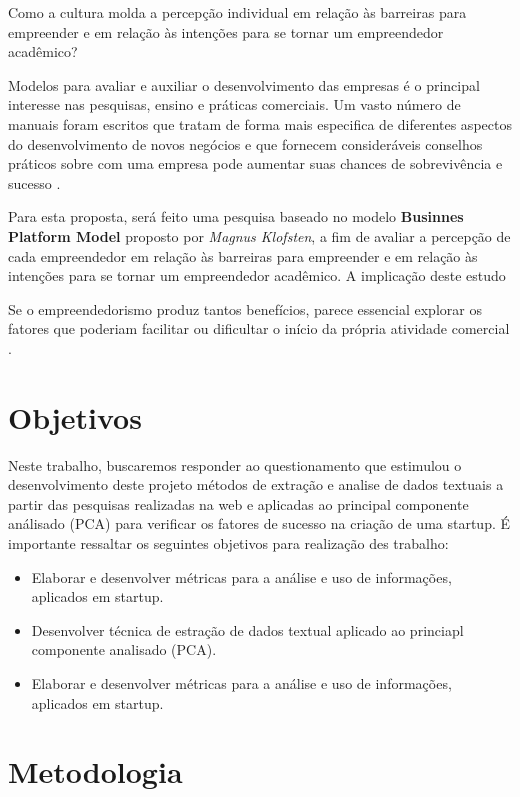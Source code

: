 \documentclass[12pt]{article}
\begin{document}
Como a cultura molda a percepção individual em relação às barreiras para empreender e em relação às intenções para se tornar um empreendedor acadêmico?

Modelos para avaliar e auxiliar o desenvolvimento das empresas é o principal interesse nas pesquisas, ensino e práticas comerciais. Um vasto número de manuais foram escritos que tratam de forma mais especifica de diferentes aspectos do desenvolvimento de novos negócios e que fornecem consideráveis conselhos práticos sobre com uma empresa pode aumentar suas chances de sobrevivência e sucesso \cite{davidsson2003business:2003}.

Para esta proposta, será feito uma pesquisa baseado no modelo \textbf{Businnes Platform Model} proposto por \textit{Magnus Klofsten}, a fim de avaliar a percepção de cada empreendedor em relação às barreiras para empreender e em relação às intenções para se tornar um empreendedor acadêmico. A implicação deste estudo 

Se o empreendedorismo produz tantos benefícios, parece essencial explorar os fatores que poderiam facilitar ou dificultar o início da própria atividade comercial \cite{staniewski2015motivating:2015}.

\section{Objetivos} \label{sec:objec}

Neste trabalho, buscaremos responder ao questionamento que estimulou o desenvolvimento 	deste projeto  métodos de extração e analise de dados textuais a partir das pesquisas realizadas na web e aplicadas ao principal componente análisado (PCA) para verificar os fatores de sucesso na criação de uma startup. É importante ressaltar os seguintes objetivos para realização des trabalho:

\begin{itemize}
	\item{Elaborar e desenvolver métricas para a análise e uso de informações, aplicados em startup.}
	\item{Desenvolver técnica de estração de dados textual aplicado ao princiapl componente analisado (PCA).}
	\item{Elaborar e desenvolver métricas para a análise e uso de informações, aplicados em startup.}
\end{itemize}


\section{Metodologia} \label{sec:Metod}
\end{document}
